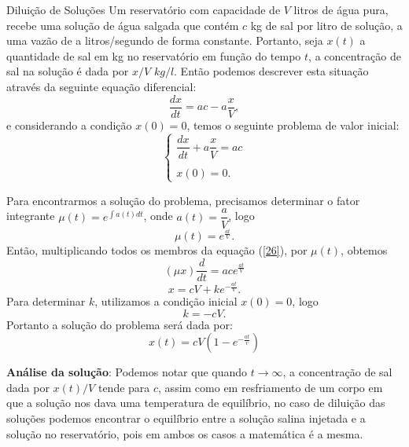 \documentclass[blue]{beamer}
\numberwithin{equation}{section}
\begin{document}
\begin{frame}{Diluição de Soluções}
\justifying
\hspace{0.2cm} Um reservatório com capacidade de $V$ litros de água pura, recebe uma solução de água salgada que contém $c$ kg de sal por litro de solução, a uma vazão de a litros/segundo de forma constante. Portanto, seja $x(t)$ a quantidade de sal em kg no reservatório em função do tempo $t$, a concentração de sal na solução é dada por $x/V$ $kg/l$. Então podemos descrever esta situação através da seguinte equação diferencial:
\begin{equation} \label{26}
\dfrac{dx}{dt} = ac - a\dfrac{x}{V},
\end{equation}
e considerando a condição $x(0) = 0$, temos o seguinte problema de valor inicial:
$$\left\lbrace
\begin{array}{lcl} 
\dfrac{dx}{dt} + a\dfrac{x}{V} = ac \\
\\
x(0) = 0.
\end{array}
\right.$$
\end{frame}

\begin{frame}
	\hspace{0.2cm} Para encontrarmos a solução do problema, precisamos determinar o fator integrante $\mu (t) = e^{\int{a(t) dt}}$, onde $a(t) = \dfrac{a}{V}$, logo
	$$\mu (t) = e^{\frac{at}{V}}.$$
	Então, multiplicando todos os membros da equação (\ref{26}), por $\mu (t)$, obtemos
	$$(\mu x) \dfrac{d}{dt} = ac e^{\frac{at}{V}}$$
	$$x = cV + k e^{-\frac{at}{V}}.$$
	Para determinar $k$, utilizamos a condição inicial $x(0) = 0$, logo
	$$k = - cV.$$
	Portanto a solução do problema será dada por:
	\begin{equation}\label{27}
	x(t) = cV(1 - e^{-\frac{at}{v}})
	\end{equation}
		
\end{frame}

\begin{frame}
\begin{flushleft}
	\justifying
	\textbf{Análise da solução}: Podemos notar que quando $t \rightarrow \infty$, a concentração de sal dada por $x(t)/V$ tende para $c$, assim como em resfriamento de um corpo em que a solução nos dava uma temperatura de equilíbrio, no caso de diluição das soluções podemos encontrar o equilíbrio entre a solução salina injetada e a solução no reservatório, pois em ambos os casos a matemática é a mesma. \end{flushleft}

\end{frame}
\end{document}

